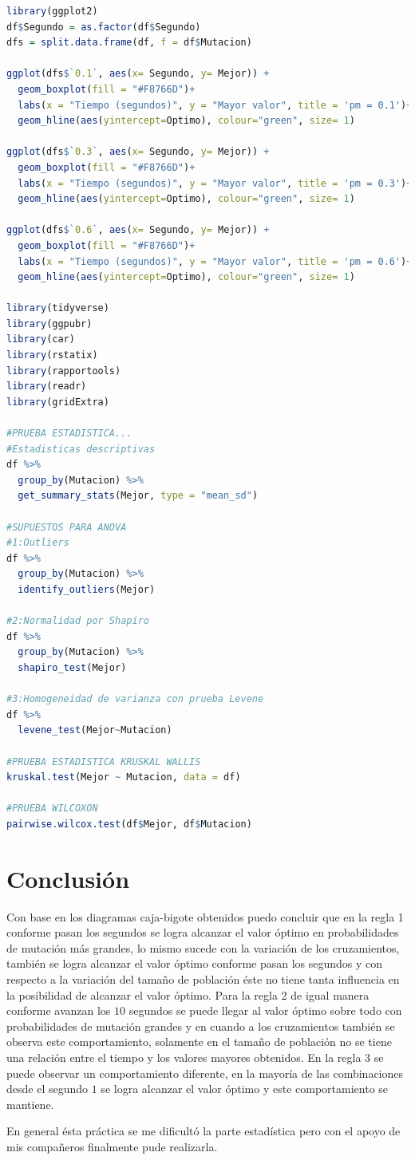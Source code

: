 \documentclass{article}
\begin{document}
\lstset{style=mystyle}
\begin{lstlisting}[language=R, caption= Código para las pruebas estadísticas \texttt{Kruskal Wallis} y \texttt{Wilcoxon}.]
library(ggplot2)
df$Segundo = as.factor(df$Segundo)
dfs = split.data.frame(df, f = df$Mutacion)

ggplot(dfs$`0.1`, aes(x= Segundo, y= Mejor)) + 
  geom_boxplot(fill = "#F8766D")+
  labs(x = "Tiempo (segundos)", y = "Mayor valor", title = 'pm = 0.1')+
  geom_hline(aes(yintercept=Optimo), colour="green", size= 1)

ggplot(dfs$`0.3`, aes(x= Segundo, y= Mejor)) + 
  geom_boxplot(fill = "#F8766D")+
  labs(x = "Tiempo (segundos)", y = "Mayor valor", title = 'pm = 0.3')+
  geom_hline(aes(yintercept=Optimo), colour="green", size= 1)

ggplot(dfs$`0.6`, aes(x= Segundo, y= Mejor)) + 
  geom_boxplot(fill = "#F8766D")+
  labs(x = "Tiempo (segundos)", y = "Mayor valor", title = 'pm = 0.6')+
  geom_hline(aes(yintercept=Optimo), colour="green", size= 1)

library(tidyverse)
library(ggpubr)
library(car)
library(rstatix)
library(rapportools)
library(readr)
library(gridExtra)

#PRUEBA ESTADISTICA...
#Estadisticas descriptivas
df %>%
  group_by(Mutacion) %>%
  get_summary_stats(Mejor, type = "mean_sd")

#SUPUESTOS PARA ANOVA
#1:Outliers
df %>%
  group_by(Mutacion) %>%
  identify_outliers(Mejor)

#2:Normalidad por Shapiro
df %>%
  group_by(Mutacion) %>%
  shapiro_test(Mejor)

#3:Homogeneidad de varianza con prueba Levene
df %>%
  levene_test(Mejor~Mutacion)

#PRUEBA ESTADISTICA KRUSKAL WALLIS
kruskal.test(Mejor ~ Mutacion, data = df)

#PRUEBA WILCOXON
pairwise.wilcox.test(df$Mejor, df$Mutacion)
\end{lstlisting}

\newpage
\section{Conclusi\'{o}n}
Con base en los diagramas caja-bigote obtenidos puedo concluir que en la regla 1 conforme pasan los segundos se logra alcanzar el valor óptimo en probabilidades de mutación más grandes, lo mismo sucede con la variación de los cruzamientos, también se logra alcanzar el valor óptimo conforme pasan los segundos y con respecto a la variación del tamaño de población éste no tiene tanta influencia en la posibilidad de alcanzar el valor óptimo. Para la regla 2 de igual manera conforme avanzan los $10$ segundos se puede llegar al valor óptimo sobre todo con probabilidades de mutación grandes y en cuando a los cruzamientos también se observa este comportamiento, solamente en el tamaño de población no se tiene una relación entre el tiempo y los valores mayores obtenidos. En la regla 3 se puede observar un comportamiento diferente, en la mayoría de las combinaciones desde el segundo $1$ se logra alcanzar el valor óptimo y este comportamiento se mantiene. 
\smallskip

En general ésta práctica se me dificultó la parte estadística pero con el apoyo de mis compañeros finalmente pude realizarla.
\newpage



\end{document}
